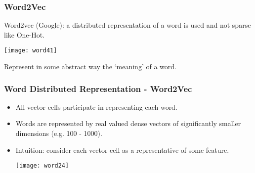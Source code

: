 








\begin{frame}[fragile]\frametitle{Word2Vec}
Word2vec  (Google): a distributed representation of a word is used and not sparse like One-Hot.
\begin{center}
\texttt{[image: word41]}
\end{center}
Represent in some abstract way the `meaning' of a word.

\end{frame}

\begin{frame}[fragile]\frametitle{Word Distributed Representation - Word2Vec}
\begin{itemize}
\item All vector cells participate in representing each word.
\item Words are represented by real valued dense vectors of significantly smaller dimensions (e.g. 100 - 1000).
\item  Intuition: consider each vector cell as a representative of some feature.
\begin{center}
\texttt{[image: word24]}
\end{center}
\end{itemize}
\end{frame}


